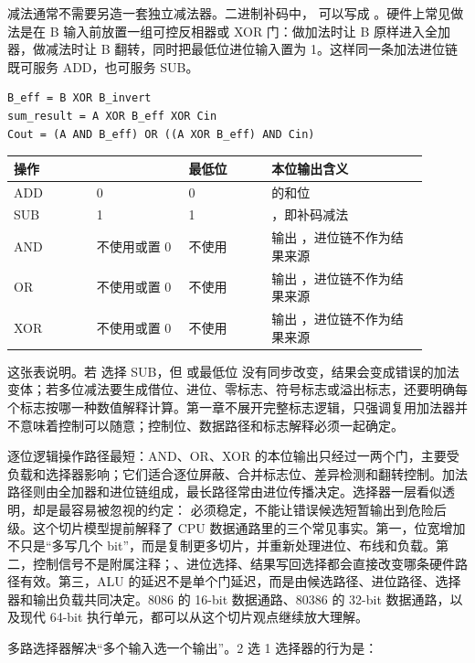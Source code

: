 减法通常不需要另造一套独立减法器。二进制补码中， 可以写成 。硬件上常见做法是在 B 输入前放置一组可控反相器或 XOR 门：做加法时让 B 原样进入全加器，做减法时让 B 翻转，同时把最低位进位输入置为 1。这样同一条加法进位链既可服务 ADD，也可服务 SUB。

\begin{lstlisting}
B_eff = B XOR B_invert
sum_result = A XOR B_eff XOR Cin
Cout = (A AND B_eff) OR ((A XOR B_eff) AND Cin)
\end{lstlisting}

\begin{longtable}{L{0.18\linewidth}L{0.2\linewidth}L{0.18\linewidth}L{0.34\linewidth}}
\toprule
操作 &  & 最低位  & 本位输出含义 \\
\midrule
ADD & 0 & 0 &  的和位 \\
SUB & 1 & 1 & ，即补码减法 \\
AND & 不使用或置 0 & 不使用 & 输出 ，进位链不作为结果来源 \\
OR & 不使用或置 0 & 不使用 & 输出 ，进位链不作为结果来源 \\
XOR & 不使用或置 0 & 不使用 & 输出 ，进位链不作为结果来源 \\
\bottomrule
\end{longtable}

这张表说明。若  选择 SUB，但  或最低位  没有同步改变，结果会变成错误的加法变体；若多位减法要生成借位、进位、零标志、符号标志或溢出标志，还要明确每个标志按哪一种数值解释计算。第一章不展开完整标志逻辑，只强调复用加法器并不意味着控制可以随意；控制位、数据路径和标志解释必须一起确定。

逐位逻辑操作路径最短：AND、OR、XOR 的本位输出只经过一两个门，主要受负载和选择器影响；它们适合逐位屏蔽、合并标志位、差异检测和翻转控制。加法路径则由全加器和进位链组成，最长路径常由进位传播决定。选择器一层看似透明，却是最容易被忽视的约定： 必须稳定，不能让错误候选短暂输出到危险后级。这个切片模型提前解释了 CPU 数据通路里的三个常见事实。第一，位宽增加不只是“多写几个 bit”，而是复制更多切片，并重新处理进位、布线和负载。第二，控制信号不是附属注释；、进位选择、结果写回选择都会直接改变哪条硬件路径有效。第三，ALU 的延迟不是单个门延迟，而是由候选路径、进位路径、选择器和输出负载共同决定。8086 的 16-bit 数据通路、80386 的 32-bit 数据通路，以及现代 64-bit 执行单元，都可以从这个切片观点继续放大理解。

多路选择器解决“多个输入选一个输出”。2 选 1 选择器的行为是：

